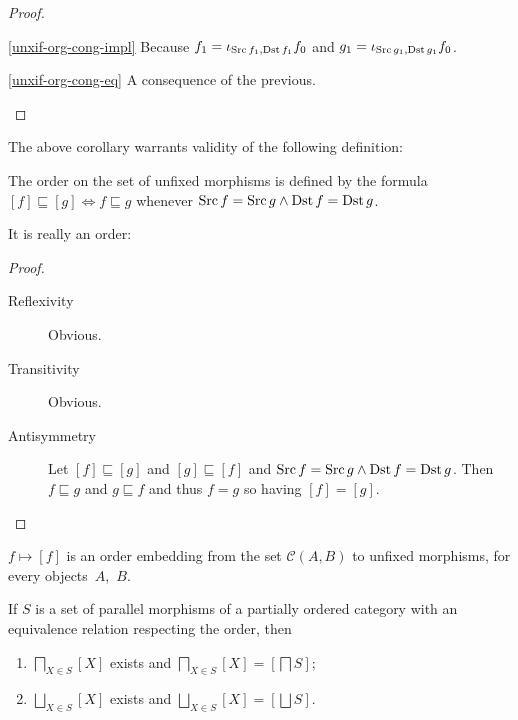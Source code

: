 \begin{proof}
~
\begin{disorder}
\item[\ref{unxif-org-cong-impl}] Because
$f_1=\iota_{\operatorname{Src} f_1,\operatorname{Dst} f_1}f_0$ and
$g_1=\iota_{\operatorname{Src} g_1,\operatorname{Dst} g_1}f_0$.
\item[\ref{unxif-org-cong-eq}] A consequence of the
previous.
\end{disorder}
\end{proof}

The above corollary warrants validity of the following
definition:

\begin{defn}
The order on the set of unfixed morphisms is defined
by the formula
$[f]\sqsubseteq[g]\Leftrightarrow f\sqsubseteq g$
whenever $\operatorname{Src} f=\operatorname{Src} g\land\operatorname{Dst} f=\operatorname{Dst} g$.
\end{defn}

It is really an order:

\begin{proof}
~
\begin{description}
\item[Reflexivity] Obvious.
\item[Transitivity] Obvious.
\item[Antisymmetry] Let $[f]\sqsubseteq[g]$ and
$[g]\sqsubseteq[f]$ and $\operatorname{Src} f=\operatorname{Src} g\land\operatorname{Dst} f=\operatorname{Dst} g$.
Then $f\sqsubseteq g$ and $g\sqsubseteq f$ and thus
$f=g$ so having $[f]=[g]$.
\end{description}
\end{proof}

\begin{obvious}\label{unfix-mor-emb}
$f\mapsto[f]$ is an order embedding from the set
$\mathcal{C}(A,B)$ to unfixed morphisms, for every
objects~$A$,~$B$.
\end{obvious}

\begin{prop}\label{cmpl-lat-par}
If $S$ is a set of parallel morphisms of a partially ordered
category with an equivalence relation respecting the order, then
\begin{enumerate}
\item\label{cmpl-lat-par-cap}
$\bigsqcap_{X\in S}[X]$ exists and 
$\bigsqcap_{X\in S}[X]=[\bigsqcap S]$;

\item\label{cmpl-lat-par-cup}
$\bigsqcup_{X\in S}[X]$ exists and 
$\bigsqcup_{X\in S}[X]=[\bigsqcup S]$.
\end{enumerate}
\end{prop}

